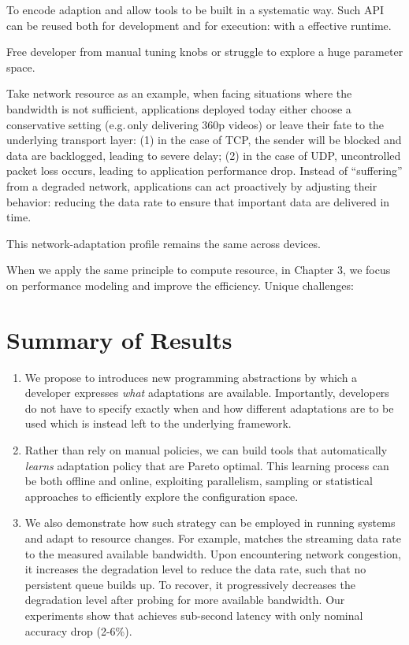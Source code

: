 \documentclass[thesis.tex]{subfiles}
\begin{document}
 To encode adaption and allow tools to be built in a systematic way.
Such API can be reused both for development and for execution: with a effective
runtime.

 Free developer from manual tuning
knobs or struggle to explore a huge parameter space.

Take network resource as an example, when facing situations where the bandwidth
is not sufficient, applications deployed today either choose a conservative
setting (e.g.\,only delivering 360p videos) or leave their fate to the
underlying transport layer: (1) in the case of TCP, the sender will be blocked
and data are backlogged, leading to severe delay; (2) in the case of UDP,
uncontrolled packet loss occurs, leading to application performance
drop. Instead of ``suffering'' from a degraded network, applications can act
proactively by adjusting their behavior: reducing the data rate to ensure that
important data are delivered in time.

This network-adaptation profile remains the same across devices.

When we apply the same principle to compute resource, in Chapter 3, we focus on
performance modeling and improve the efficiency. Unique challenges:

\section{Summary of Results}
\label{sec:summary-results-1}

\begin{enumerate}
\item We propose to introduces new programming abstractions by which a developer
  expresses \emph{what} adaptations are available. Importantly, developers do
  not have to specify exactly when and how different adaptations are to be used
  which is instead left to the underlying framework.

\item Rather than rely on manual policies, we can build tools that automatically
  \emph{learns} adaptation policy that are Pareto optimal. This learning process
  can be both offline and online, exploiting parallelism, sampling or
  statistical approaches to efficiently explore the configuration space.

\item We also demonstrate how such strategy can be employed in running systems
  and adapt to resource changes. For example, \sysname{} matches the streaming
  data rate to the measured available bandwidth. Upon encountering network
  congestion, it increases the degradation level to reduce the data rate, such
  that no persistent queue builds up. To recover, it progressively decreases the
  degradation level after probing for more available bandwidth. Our experiments
  show that \sysname{} achieves sub-second latency with only nominal accuracy
  drop (2-6\%).
\end{enumerate}
\end{document}
